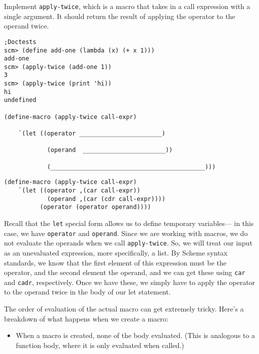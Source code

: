 \begin{blocksection}

\question Implement \texttt{apply-twice}, which is a macro that takes in a call expression with
a single argument. It should return the result of applying the operator to the operand twice.

\begin{lstlisting}
;Doctests
scm> (define add-one (lambda (x) (+ x 1)))
add-one
scm> (apply-twice (add-one 1))
3
scm> (apply-twice (print 'hi)) 
hi
undefined

(define-macro (apply-twice call-expr)
    
    `(let ((operator _______________________)

            (operand  _______________________))
            
            (___________________________________________)))
\end{lstlisting}

\begin{solution}[0.5in]
\begin{lstlisting}
(define-macro (apply-twice call-expr)
    `(let ((operator ,(car call-expr))
            (operand ,(car (cdr call-expr))))
          (operator (operator operand))))
\end{lstlisting}
Recall that the \lstinline{let} special form allows us to define temporary variables— in this case, 
we have \lstinline{operator} and \lstinline{operand}. Since we are working with macros, we do not evaluate the 
operands when we call \lstinline{apply-twice}. So, we will treat our input as an unevaluated 
expression, more specifically, a list. By Scheme syntax standards, we know that the 
first element of this expression must be the operator, and the second element the 
operand, and we can get these using \lstinline{car} and \lstinline{cadr}, respectively. Once we have these, 
we simply have to apply the operator to the operand twice in the body of our let 
statement.


The order of evaluation of the actual macro can get extremely tricky. 
Here’s a breakdown of what happens when we create a macro:

\begin{itemize}
  \item When a macro is created, none of the body evaluated. (This is analogous to a 
  function body, where it is only evaluated when called.)
\end{itemize}
\end{solution}
\end{blocksection}

